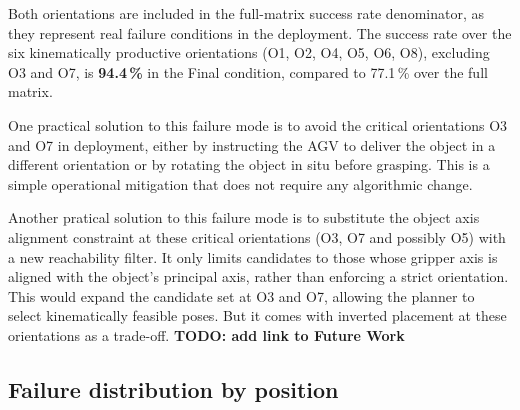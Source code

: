 \documentclass[12pt, a4paper]{report}
\begin{document}
Both orientations are included in the full-matrix success rate denominator, as they represent real failure conditions in the deployment. The success rate over the six kinematically productive orientations (O1, O2, O4, O5, O6, O8), excluding O3 and O7, is \textbf{94.4\,\%} in the Final condition, compared to 77.1\,\% over the full matrix.

One practical solution to this failure mode is to avoid the critical orientations O3 and O7 in deployment, either by instructing the AGV to deliver the object in a different orientation or by rotating the object in situ before grasping. This is a simple operational mitigation that does not require any algorithmic change.


Another pratical solution to this failure mode is to substitute the object axis alignment constraint at these critical orientations (O3, O7 and possibly O5) with a new reachability filter. It only limits candidates to those whose gripper axis is aligned with the object's principal axis, rather than enforcing a strict orientation. This would expand the candidate set at O3 and O7, allowing the planner to select kinematically feasible poses. But it comes with inverted placement at these orientations as a trade-off. \textbf{TODO: add link to Future Work}







\subsection{Failure distribution by position}
\label{sec:failure-distribution-by-position}
\end{document}
